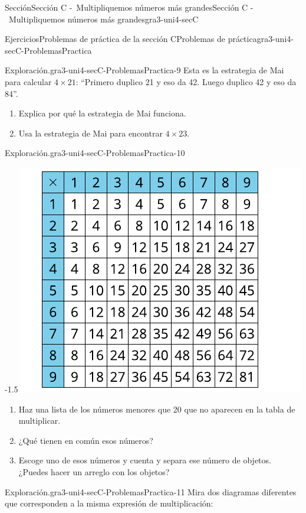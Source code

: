\documentclass[twoside,10pt,]{article}
\begin{document}
\begin{sectionptx}{Sección}{Sección C -~Multipliquemos números más grandes}{}{Sección C -~Multipliquemos números más grandes}{}{}{gra3-uni4-secC}
\begin{exercises-subsection}{Ejercicios}{Problemas de práctica de la sección C}{}{Problemas de práctica}{}{}{gra3-uni4-secC-ProblemasPractica}
\begin{divisionexercise}{7}{Exploración.}{}{gra3-uni4-secC-ProblemasPractica-9}
Esta es la estrategia de Mai para calcular \(4 \times 21\): “Primero duplico 21 y eso da 42. Luego duplico 42 y eso da 84”.%
%
\begin{enumerate}[label={(\alph*)}]
\item{}Explica por qué la estrategia de Mai funciona.%
\item{}Usa la estrategia de Mai para encontrar \(4 \times 23\).%
\end{enumerate}
\end{divisionexercise}%
\begin{divisionexercise}{8}{Exploración.}{}{gra3-uni4-secC-ProblemasPractica-10}%
\begin{image}{0}{1}{0}{-1.5\baselineskip}%
\includegraphics[width=\linewidth]{external/svg-source/tikz-file-151679-scale13.pdf}
\end{image}%
%
\begin{enumerate}[label={(\alph*)}]
\item{}Haz una lista de los números menores que 20 que no aparecen en la tabla de multiplicar.%
\item{}¿Qué tienen en común esos números?%
\item{}Escoge uno de esos números y cuenta y separa ese número de objetos. ¿Puedes hacer un arreglo con los objetos?%
\end{enumerate}
\end{divisionexercise}%
\begin{divisionexercise}{9}{Exploración.}{}{gra3-uni4-secC-ProblemasPractica-11}%
Mira dos diagramas diferentes que corresponden a la misma expresión de multiplicación:%

\end{divisionexercise}
\end{exercises-subsection}
\end{sectionptx}
\end{document}
